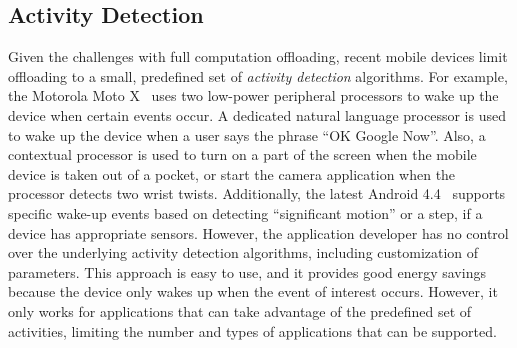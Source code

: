 
\subsection{Activity Detection}

Given the challenges with full computation offloading, recent mobile
devices limit offloading to a small, predefined set of \emph{activity
  detection} algorithms. For example, the Motorola Moto X~\cite{motox}
uses two low-power peripheral processors to wake up the device when
certain events occur. A dedicated natural language processor is used
to wake up the device when a user says the phrase ``OK Google Now''.
Also, a contextual processor is used to turn on a part of the screen
when the mobile device is taken out of a pocket, or start the camera
application when the processor detects two wrist twists. Additionally,
the latest Android 4.4~\cite{android4.4} supports specific wake-up
events based on detecting ``significant motion'' or a step, if a device
has appropriate sensors. However, the application developer has no
control over the underlying activity detection algorithms, including
customization of parameters. This approach is easy to use, and it
provides good energy savings because the device only wakes up when the
event of interest occurs. However, it only works for applications that
can take advantage of the predefined set of activities, limiting the
number and types of applications that can be supported.




